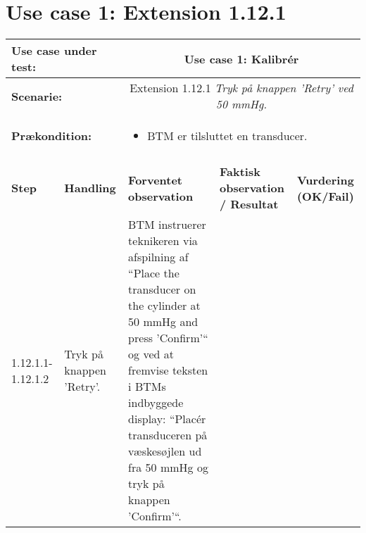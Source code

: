 \section{Use case 1: Extension 1.12.1}
\begin{tabular}{|p{1.5cm}|p{3cm}|p{4cm}|p{4cm}|p{2cm}|}
\hline
\multicolumn{2}{|p{3cm}|}{\textbf{Use case under test:}} & \multicolumn{3}{c|}{Use case 1: Kalibrér } \\\hline

\multicolumn{2}{|p{3cm}|}{\textbf{Scenarie:}} & \multicolumn{3}{c|}{Extension 1.12.1 \textit{Tryk på knappen 'Retry' ved 50 mmHg.}} \\\hline
\multicolumn{2}{|p{3cm}|}{\textbf{Prækondition:}}  & \multicolumn{3}{l|}{\parbox{0.6\textwidth}{
\begin{itemize}[label=$\circ$]
\item BTM er tilsluttet en transducer. 
\end{itemize} }}\\\hline

\multicolumn{5}{|c|}{} \\\hline

\textbf{Step} & \textbf{Handling} & \textbf{Forventet observation} & \textbf{Faktisk observation / Resultat} & \textbf{Vurdering (OK/Fail)}\\\hline

1.12.1.1-1.12.1.2 & Tryk på knappen 'Retry'. & BTM instruerer teknikeren via afspilning af “Place the
transducer on the cylinder at 50 mmHg and press ’Confirm’“
og ved at fremvise teksten i BTMs indbyggede
display: “Placér transduceren på væskesøjlen ud fra
50 mmHg og tryk på knappen ’Confirm’“. & & \\\hline

\end{tabular}

